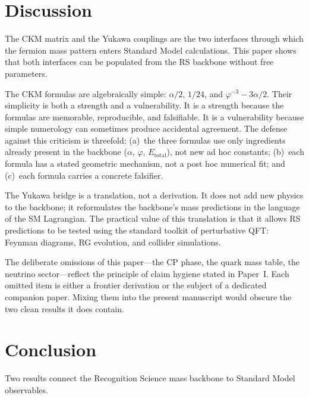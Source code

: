 \documentclass[11pt]{article}
\theoremstyle{remark}
\newcommand{\phig}{\varphi}
\newcommand{\Etot}{E_{\mathrm{total}}}
\begin{document}
\section{Discussion}
\label{sec:discussion}

The CKM matrix and the Yukawa couplings are the two
interfaces through which the fermion mass pattern enters
Standard Model calculations.  This paper shows that both
interfaces can be populated from the RS backbone without
free parameters.

The CKM formulas are algebraically simple: $\alpha/2$,
$1/24$, and $\phig^{-3}-3\alpha/2$.  Their simplicity is
both a strength and a vulnerability.  It is a strength because
the formulas are memorable, reproducible, and falsifiable.
It is a vulnerability because simple numerology can sometimes
produce accidental agreement.  The defense against this
criticism is threefold: (a)~the three formulas use only
ingredients already present in the backbone ($\alpha$, $\phig$,
$\Etot$), not new ad hoc constants; (b)~each formula has
a stated geometric mechanism, not a post hoc numerical fit;
and (c)~each formula carries a concrete falsifier.

The Yukawa bridge is a translation, not a derivation.  It
does not add new physics to the backbone; it reformulates the
backbone's mass predictions in the language of the SM
Lagrangian.  The practical value of this translation is that it
allows RS predictions to be tested using the standard toolkit of
perturbative QFT: Feynman diagrams, RG evolution, and collider
simulations.

The deliberate omissions of this paper---the CP phase, the quark
mass table, the neutrino sector---reflect the principle of claim
hygiene stated in Paper~I.  Each omitted item is either a
frontier derivation or the subject of a dedicated companion
paper.  Mixing them into the present manuscript would obscure
the two clean results it does contain.

\section{Conclusion}

Two results connect the Recognition Science mass backbone to
Standard Model observables.
\end{document}
